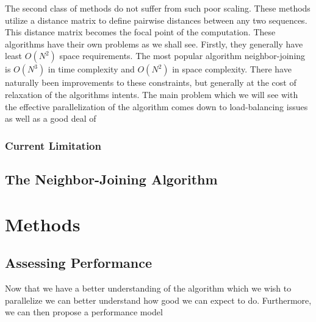 \documentclass[letterpaper,12pt]{article}
\begin{document}
The second class of methods do not suffer from such poor
scaling. These methods utilize a distance matrix to define pairwise
distances between any two sequences. This distance matrix becomes the
focal point of the computation. These algorithms have their own
problems as we shall see. Firstly, they generally have least $O(N^2)$
space requirements. The most popular algorithm neighbor-joining is
$O(N^3)$ in time complexity and $O(N^2)$ in space complexity. There
have naturally been improvements to these constraints, but generally
at the cost of relaxation of the algorithms intents. The main problem
which we will see with the effective parallelization of the algorithm
comes down to load-balancing issues as well as a good deal of 

\subsubsection{Current Limitation}

\subsection{The Neighbor-Joining Algorithm}

\section{Methods}
\subsection{Assessing Performance}
Now that we have a better understanding of the algorithm which we wish
to parallelize we can better understand how good we can expect to
do. Furthermore, we can then propose a performance model 
\end{document}
